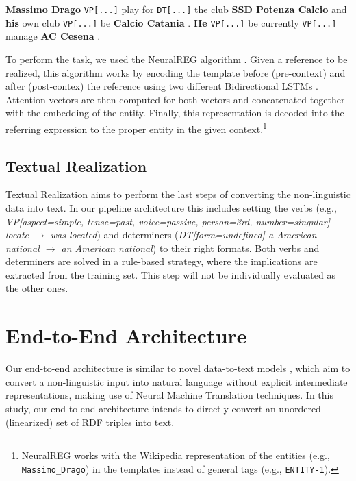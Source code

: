 \documentclass[11pt,a4paper]{article}
\begin{document}
\vspace{0.3cm}
\begin{displayquote}
    \footnotesize
    \vspace{0.1cm}
    \noindent \textbf{Massimo Drago} \texttt{VP[...]} play for \texttt{DT[...]} the club \textbf{SSD Potenza Calcio} and \textbf{his} own club \texttt{VP[...]} be \textbf{Calcio Catania} . \textbf{He} \texttt{VP[...]} be currently \texttt{VP[...]} manage \textbf{AC Cesena} .
    \vspace{0.1cm}
\end{displayquote}
\vspace{0.1cm}

To perform the task, we used the NeuralREG algorithm \cite{ferreira2018}. Given a reference to be realized, this algorithm works by encoding the template before (pre-context) and after (post-contex) the reference using two different Bidirectional LSTMs \cite{hochreiter1997}. Attention vectors are then computed for both vectors and concatenated together with the embedding of the entity. Finally, this representation is decoded into the referring expression to the proper entity in the given context.\footnote{NeuralREG works with the Wikipedia representation of the entities (e.g., \texttt{Massimo\_Drago}) in the templates instead of general tags (e.g., \texttt{ENTITY-1}).}


\subsection{Textual Realization}

Textual Realization aims to perform the last steps of converting the non-linguistic data into text. In our pipeline architecture this includes setting the verbs (e.g., \textit{VP[aspect=simple, tense=past, voice=passive, person=3rd, number=singular] locate $\rightarrow$ was located}) and determiners (\textit{DT[form=undefined] a American national $\rightarrow$ an American national}) to their right formats. Both verbs and determiners are solved in a rule-based strategy, where the implications are extracted from the training set. This step will not be individually evaluated as the other ones.

\section{End-to-End Architecture}

Our end-to-end architecture is similar to novel data-to-text models \cite{wen2015,dusek2016,mei2016,lebret2016,gehrmann2018}, which aim to convert a non-linguistic input into natural language without explicit intermediate representations, making use of Neural Machine Translation techniques. In this study, our end-to-end architecture intends to directly convert an unordered (linearized) set of RDF triples into text.
\end{document}
